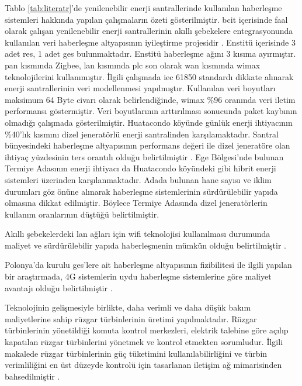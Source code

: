 Tablo \ref{tab:literatr}'de yenilenebilir enerji santrallerinde kullanılan haberleşme sistemleri hakkında yapılan çalışmaların özeti gösterilmiştir. \gls{bcit} içerisinde faal olarak çalışan yenilenebilir enerji santrallerinin akıllı şebekelere entegrasyonunda kullanılan veri haberleşme altyapısının iyileştirme projesidir \cite{BCIT}. Enstitü içerisinde 3 adet \gls{res}, 1 adet \gls{ges} bulunmaktadır. Enstitü haberleşme ağını 3 kısıma ayırmıştır. \gls{pan} kısmında Zigbee, \gls{lan} kısmında \gls{plc} son olarak \gls{wan} kısmında \gls{wimax} teknolojilerini kullanımıştır. İlgili çalışmada \gls{iec} 61850 standardı dikkate alınarak enerji santrallerinin veri modellenmesi yapılmıştır. Kullanılan veri boyutları maksimum 64 Byte civarı olarak belirlendiğinde, \gls{wimax} \%96 oranında veri iletim performansı göstermiştir. Veri boyutlarının arttırılması sonucunda paket kaybının olmadığı çalışmada gösterilmiştir. Huatacondo köyünde günlük enerji ihtiyacının \%40'lık kısmını dizel jeneratörlü enerji santralinden karşılamaktadır. Santral bünyesindeki haberleşme altyapısının performans değeri ile dizel jeneratöre olan ihtiyaç yüzdesinin ters orantılı olduğu belirtilmiştir \cite{microgrid_siliOrnek}. Ege Bölgesi'nde bulunan Termiye Adasının enerji ihtiyacı da Huatacondo köyündeki gibi hibrit enerji sistemleri üzerinden karşılanmaktadır. Adada bulunan hane sayısı ve iklim durumları göz önüne alınarak haberleşme sistemlerinin sürdürülebilir yapıda olmasına dikkat edilmiştir. Böylece Termiye Adasında dizel jeneratörlerin kullanım oranlarının düştüğü belirtilmiştir\cite{yunanOrnek}.

Akıllı şebekelerdeki \gls{lan} ağları için \gls{wifi} teknolojisi kullanılması durumunda maliyet ve sürdürülebilir yapıda haberleşmenin mümkün olduğu belirtilmiştir \cite{5779257}.

Polonya'da kurulu \gls{ges}'lere ait haberleşme altyapısının fizibilitesi ile ilgili yapılan bir araştırmada, 4G sistemlerin uydu haberleşme sistemlerine göre maliyet avantajı olduğu belirtilmiştir \cite{TbarMartnez2021PositiveEO}.


Teknolojinin gelişmesiyle birlikte, daha verimli ve daha düşük bakım maliyetlerine sahip rüzgar türbinlerinin üretimi yapılmaktadır. Rüzgar türbinlerinin yönetildiği komuta kontrol merkezleri, elektrik talebine göre açılıp kapatılan rüzgar türbinlerini yönetmek ve kontrol etmekten sorumludur. İlgili makalede rüzgar türbinlerinin güç tüketimini kullanılabilirliğini ve türbin verimliliğini en üst düzeyde kontrolü için tasarlanan iletişim ağ mimarisinden bahsedilmiştir \cite{ahmed2014communication}.

